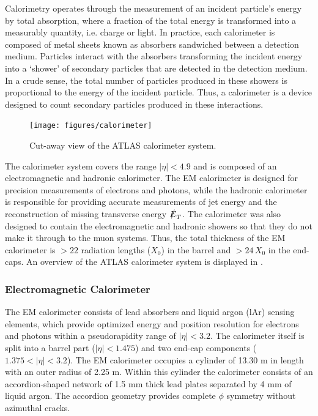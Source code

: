 Calorimetry operates through the measurement of an incident particle's energy
by total absorption, where a fraction of the total energy is transformed
into a measurably quantity, i.e. charge or light. In practice,
each calorimeter is composed of metal sheets known as absorbers sandwiched 
between a detection medium. Particles interact with the absorbers transforming
the incident energy into a `shower' of secondary particles that are detected
in the detection medium. In a crude sense, the total number of particles
produced in these showers is proportional to the energy of the incident particle.
Thus, a calorimeter is a device designed to count secondary particles 
produced in these interactions.

\begin{figure}[!hbpt]
  \centering
  \texttt{[image: figures/calorimeter]}
  \caption{Cut-away view of the ATLAS calorimeter system.}
  \label{fig:cal}
\end{figure}

The calorimeter system covers the range $|\eta| < 4.9$ and is composed of an
electromagnetic and hadronic calorimeter. The EM calorimeter is designed for
precision measurements of electrons and photons, while the hadronic calorimeter is
responsible for providing accurate measurements of jet energy and the reconstruction
of missing transverse energy $\slashed{E}_T$. The calorimeter was also designed
to contain the electromagnetic and hadronic showers so that they do not
make it through to the muon systems. Thus, the total thickness of the EM 
calorimeter is $> 22$ radiation lengths ($X_0$) in the barrel and $> 24\,X_0$
in the end-caps.
An overview of the ATLAS calorimeter system is displayed in .

\subsubsection*{Electromagnetic Calorimeter}
The EM calorimeter consists of lead absorbers and liquid argon (lAr) sensing
elements, which provide optimized energy and position resolution for electrons
and photons within a pseudorapidity range of $|\eta| < 3.2$. The calorimeter
itself is split into a barrel part ($|\eta| < 1.475$) and two end-cap components
($1.375 < |\eta| < 3.2$). The EM calorimeter occupies a cylinder of 13.30 m in length
with an outer radius of 2.25 m.  Within this cylinder the calorimeter consists
of an accordion-shaped network of 1.5 mm thick lead plates separated 
by 4 mm of liquid argon. The accordion geometry provides complete $\phi$ symmetry
without azimuthal cracks.

